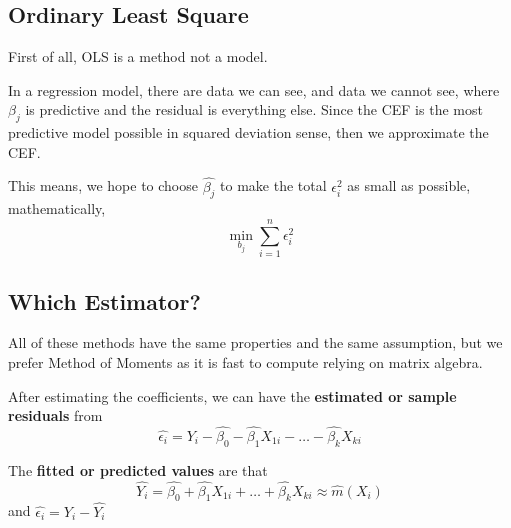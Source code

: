 \subsection{Ordinary Least Square}
First of all, OLS is a method not a model.

In a regression model, there are data we can see, and data we cannot see, where $\beta_j$ is predictive and the residual is everything else. Since the CEF is the most predictive model possible in squared deviation sense, then we approximate the CEF.

This means, we hope to choose $\hat{\beta_j}$ to make the total $\epsilon_i^2$ as small as possible, mathematically,
$$\min_{b_j} \sum_{i=1}^{n} \epsilon_i^2$$

\subsection{Which Estimator?}
All of these methods have the same properties and the same assumption, but we prefer Method of Moments as it is fast to compute relying on matrix algebra.

After estimating the coefficients, we can have the \textbf{estimated or sample residuals} from
$$\hat{\epsilon_i} = Y_i - \hat{\beta_0} - \hat{\beta_1}X_{1i} - \dots - \hat{\beta_k}X_{ki}$$

The \textbf{fitted or predicted values} are that
$$\hat{Y_i} = \hat{\beta_0} + \hat{\beta_1}X_{1i} + \dots + \hat{\beta_k}X_{ki} \approx \hat{m}(X_i)$$
and $\hat{\epsilon_i} = Y_i - \hat{Y_i}$


\newpage